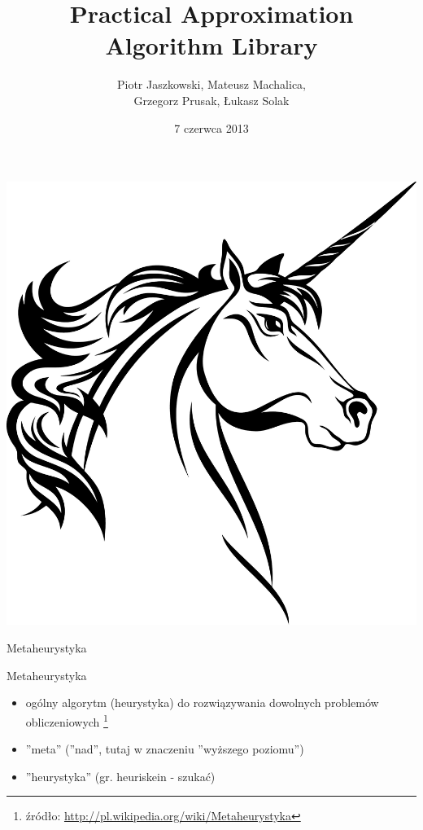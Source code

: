 \documentclass[blue]{beamer}
\title{Practical Approximation Algorithm Library}
\author{Piotr Jaszkowski, Mateusz Machalica,\\ Grzegorz Prusak, Łukasz Solak}
\date{7 czerwca 2013}
\begin{document}

\begin{frame}
\titlepage
\end{frame}

\begin{frame}
\begin{center}
\includegraphics[scale=.2]{unicorn}
\end{center}
\end{frame}

\begin{frame}{Metaheurystyka}
\begin{block}{Metaheurystyka}
\begin{itemize}
\item ogólny algorytm (heurystyka) do rozwiązywania dowolnych problemów obliczeniowych
	\footnote{źródło: \url{http://pl.wikipedia.org/wiki/Metaheurystyka}}
\item ''meta'' (''nad'', tutaj w znaczeniu ''wyższego poziomu'')
\item ''heurystyka'' (gr. heuriskein - szukać)
\end{itemize}
\end{block}
\end{frame}
\end{document}
